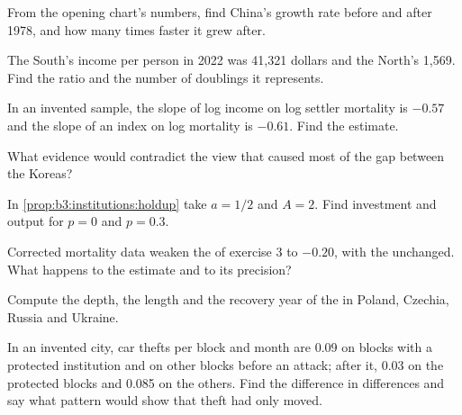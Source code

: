 \begin{exercise}[$\star$]\label{exo:b3:institutions:1}
From the opening chart's numbers, find China's growth rate before and after 1978, and how
many times faster it grew after.
\end{exercise}

\begin{exercise}[$\star$]\label{exo:b3:institutions:2}
The South's income per person in 2022 was 41{,}321 dollars and the North's 1{,}569. Find the ratio and the number of
doublings it represents.
\end{exercise}

\begin{exercise}[$\star$]\label{exo:b3:institutions:3}
In an invented sample, the slope of log income on log settler mortality is $-0.57$ and the
slope of an  index on log mortality is $-0.61$. Find the 
estimate.
\end{exercise}

\begin{exercise}[$\star$]\label{exo:b3:institutions:4}
What evidence would contradict the view that  caused most of the gap
between the Koreas?
\end{exercise}

\begin{exercise}[$\star\star$]\label{exo:b3:institutions:5}
In \cref{prop:b3:institutions:holdup} take $a = 1/2$ and $A = 2$. Find investment and output for $p = 0$ and $p = 0.3$.
\end{exercise}

\begin{exercise}[$\star\star$]\label{exo:b3:institutions:6}
Corrected mortality data weaken the  of exercise 3 to $-0.20$, with the 
unchanged. What happens to the estimate and to its precision?
\end{exercise}

\begin{exercise}[$\star\star$]\label{exo:b3:institutions:7}
Compute the depth, the length and the recovery year of the  in
Poland, Czechia, Russia and Ukraine.
\end{exercise}

\begin{exercise}[$\star\star$]\label{exo:b3:institutions:8}
In an invented city, car thefts per block and month are 0.09 on blocks with a protected
institution and on other blocks before an attack; after it, 0.03 on the protected blocks and
0.085 on the others. Find the difference in differences and say what pattern would show
that theft had only moved.
\end{exercise}

